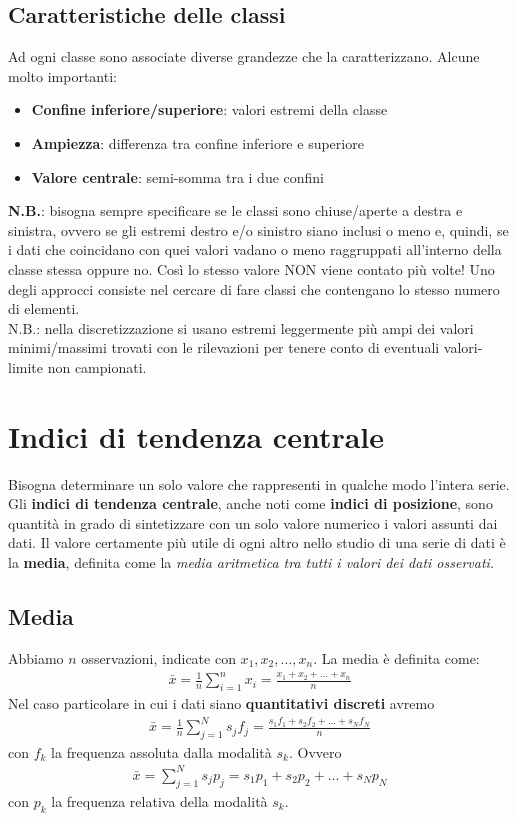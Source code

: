 \subsection{Caratteristiche delle classi}
Ad ogni classe sono associate diverse grandezze che la caratterizzano.
Alcune molto importanti:
\begin{itemize}
	\item \textbf{Confine inferiore/superiore}: valori estremi della classe
	\item \textbf{Ampiezza}: differenza tra confine inferiore e superiore
	\item \textbf{Valore centrale}: semi-somma tra i due confini
\end{itemize}
\textbf{N.B.}: bisogna sempre specificare se le classi sono chiuse/aperte a destra e sinistra, ovvero se gli estremi destro e/o sinistro siano inclusi o meno e, quindi, se i dati che coincidano con quei valori vadano o meno raggruppati all'interno della classe stessa oppure no. Così lo stesso valore NON viene contato più volte! \newline
Uno degli approcci consiste nel cercare di fare classi che contengano lo stesso numero di elementi. \\
N.B.: nella discretizzazione si usano estremi leggermente più ampi dei valori minimi/massimi trovati con le rilevazioni per tenere conto di eventuali valori-limite non campionati.


\section{Indici di tendenza centrale}
Bisogna determinare un solo valore che rappresenti in qualche modo l'intera serie.
Gli \textbf{indici di tendenza centrale}, anche noti come \textbf{indici di posizione}, sono quantità in grado di sintetizzare con un solo valore numerico i valori assunti dai dati.
\newline
Il valore certamente più utile di ogni altro nello studio di una serie di dati è la \textbf{media}, definita come la \textit{media aritmetica tra tutti i valori dei dati osservati}.

\subsection{Media}
Abbiamo $n$ osservazioni, indicate con $x_1, x_2, ..., x_n$. La media è definita come:
\begin{align}
\bar{x} = \frac{1}{n} \sum_{i=1}^n x_i = \frac{x_1 + x_2 + ... + x_n}{n}
\end{align}
Nel caso particolare in cui i dati siano \textbf{quantitativi discreti} avremo
\begin{align}
\bar{x} = \frac{1}{n} \sum_{j=1}^N s_j f_j  = \frac{s_1 f_1 + s_2 f_2 + ... + s_N f_N}{n}
\end{align}
con $f_k$ la frequenza assoluta dalla modalità $s_k$.
Ovvero
\begin{align}
\bar{x} = \sum_{j=1}^N s_j p_j  = s_1 p_1 + s_2 p_2 + ... + s_N p_N
\end{align}
con $p_k$ la frequenza relativa della modalità $s_k$.

